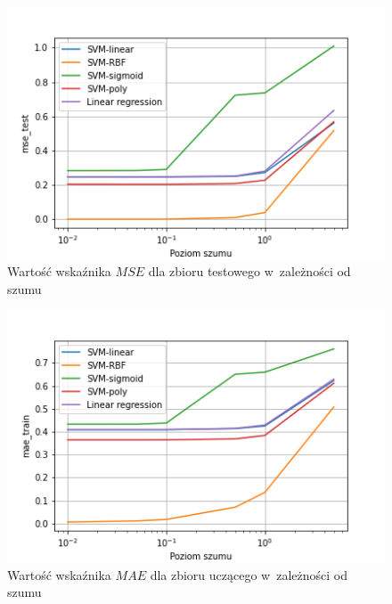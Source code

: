 \begin{figure}[h]
    \centering
    \includegraphics[width=1.1\columnwidth]{assets/mse_test.png}
    \caption{Wartość wskaźnika $MSE$ dla zbioru testowego w~zależności od szumu}
    \label{fig:noise-mse-test}
\end{figure}


\begin{figure}[h]
    \centering
    \includegraphics[width=1.1\columnwidth]{assets/mae_train.png}
    \caption{Wartość wskaźnika $MAE$ dla zbioru uczącego w~zależności od szumu}
    \label{fig:noise-mae-train}
\end{figure}

